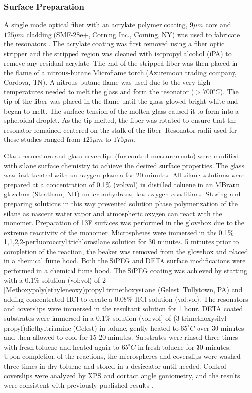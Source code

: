 \subsubsection{Surface Preparation}

A single mode optical fiber with an acrylate polymer coating, $9\mu m$
core and $125\mu m$ cladding (SMF-28e+, Corning Inc., Corning, NY)
was used to fabricate the resonators \cite{Vollmer2002}. The acrylate
coating was first removed using a fiber optic stripper and the stripped
region was cleaned with isopropyl alcohol (iPA) to remove any residual
acrylate. The end of the stripped fiber was then placed in the flame
of a nitrous-butane Microflame torch (Azuremoon trading company, Cordova,
TN). A nitrous-butane flame was used due to the very high temperatures
needed to melt the glass and form the resonator ($>700^{\circ}C$).
The tip of the fiber was placed in the flame until the glass glowed
bright white and began to melt. The surface tension of the molten
glass caused it to form into a spheroidal droplet. As the tip melted,
the fiber was rotated to ensure that the resonator remained centered
on the stalk of the fiber. Resonator radii used for these studies
ranged from $125\mu m$ to $175\mu m$.

Glass resonators and glass coverslips (for control measurements) were
modified with silane surface chemistry to achieve the desired surface
properties. The glass was first treated with an oxygen plasma for
20 minutes. All silane solutions were prepared at a concentration
of 0.1\% (vol:vol) in distilled toluene in an MBraun glovebox (Stratham,
NH) under anhydrous, low oxygen conditions. Storing and preparing
solutions in this way prevented solution phase polymerization of the
silane as nascent water vapor and atmospheric oxygen can react with
the monomer. Preparation of 13F surfaces was performed in the glovebox
due to the extreme reactivity of the monomer. Microspheres were immersed
in the 0.1\% 1,1,2,2-perfluorooctyl\,trichlorosilane solution for
30 minutes. 5 minutes prior to completion of the reaction, the beaker
was removed from the glovebox and placed in a chemical fume hood.
Both the SiPEG and DETA surface modifications were performed in a
chemical fume hood. The SiPEG coating was achieved by starting with
a 0.1\% solution (vol:vol) of 2-{[}Methoxypoly(ethyleneoxy)propyl{]}trimethoxysilane
(Gelest, Tullytown, PA) and adding concentrated HCl to create a 0.08\%
HCl solution (vol:vol). The resonators and coverslips were immersed
in the resultant solution for 1 hour. DETA coated substrates were
immersed in a 0.1\% solution (vol:vol) of (3-trimethoxysilyl propyl)diethyltriamine
(Gelest) in tolune, gently heated to $65^{\circ}C$ over 30 minutes
and then allowed to cool for 15-20 minutes. Substrates were rinsed
three times with fresh toluene and heated again to $65^{\circ}C$
in fresh toluene for 30 minutes. Upon completion of the reactions,
the microspheres and coverslips were washed three times in dry toluene
and stored in a desiccator until needed. Control coverslips were analyzed
by XPS and contact angle goniometry, and the results were consistent
with previously published results \cite{Wilson2011a}.


